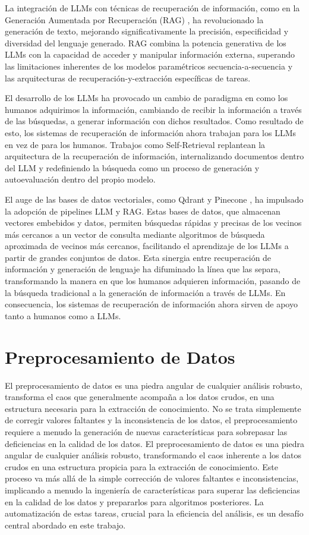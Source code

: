 La integración de LLMs con técnicas de recuperación de información, como en la Generación Aumentada por Recuperación (RAG) \cite{lewis2020retrieval}, ha revolucionado la generación de texto, mejorando significativamente la precisión, especificidad y diversidad del lenguaje generado. RAG combina la potencia generativa de los LLMs con la capacidad de acceder y manipular información externa, superando las limitaciones inherentes de los modelos paramétricos secuencia-a-secuencia y las arquitecturas de recuperación-y-extracción específicas de tareas.

El desarrollo de los LLMs ha provocado un cambio de paradigma en como los humanos adquirimos la información, cambiando de recibir la información a través de las búsquedas, a generar información con dichos resultados. Como resultado de esto, los sistemas de recuperación de información ahora trabajan para los LLMs en vez de para los humanos. Trabajos como Self-Retrieval \cite{tang2024self} replantean la arquitectura de la recuperación de información, internalizando documentos dentro del LLM y redefiniendo la búsqueda como un proceso de generación y autoevaluación dentro del propio modelo.

El auge de las bases de datos vectoriales, como Qdrant \cite{qdrant} y Pinecone \cite{pinecone}, ha impulsado la adopción de pipelines LLM y RAG. Estas bases de datos, que almacenan vectores embebidos y datos, permiten búsquedas rápidas y precisas de los vecinos más cercanos a un vector de consulta mediante algoritmos de búsqueda aproximada de vecinos más cercanos, facilitando el aprendizaje de los LLMs a partir de grandes conjuntos de datos. Esta sinergia entre recuperación de información y generación de lenguaje ha difuminado la línea que las separa, transformando la manera en que los humanos adquieren información, pasando de la búsqueda tradicional a la generación de información a través de LLMs. En consecuencia, los sistemas de recuperación de información ahora sirven de apoyo tanto a humanos como a LLMs.

\section{Preprocesamiento de Datos}

El preprocesamiento de datos es una piedra angular de cualquier análisis robusto, transforma el caos que generalmente acompaña a los datos crudos, en una estructura necesaria para la extracción de conocimiento. No se trata simplemente de corregir valores faltantes y la inconsistencia de los datos, el preprocesamiento requiere a menudo la generación de nuevas características para sobrepasar las deficiencias en la calidad de los datos. El preprocesamiento de datos es una piedra angular de cualquier análisis robusto, transformando el caos inherente a los datos crudos en una estructura propicia para la extracción de conocimiento. Este proceso va más allá de la simple corrección de valores faltantes e inconsistencias, implicando a menudo la ingeniería de características para superar las deficiencias en la calidad de los datos y prepararlos para algoritmos posteriores. La automatización de estas tareas, crucial para la eficiencia del análisis, es un desafío central abordado en este trabajo.

